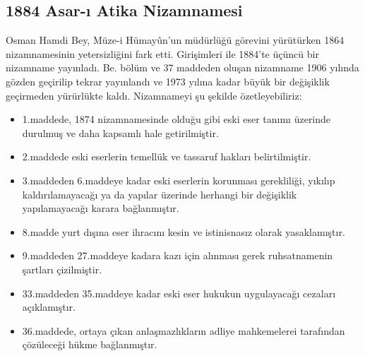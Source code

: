 \subsection{1884 Asar-ı Atika Nizamnamesi}
\indent\indent Osman Hamdi Bey, Müze-i Hümayûn'un müdürlüğü görevini yürütürken 1864 nizamnamesinin yetersizliğini fark etti. Girişimleri ile 1884'te üçüncü bir nizamname yayınladı. Be. bölüm ve 37 maddeden oluşan nizamname 1906 yılında gözden geçirilip tekrar yayınlandı ve 1973 yılına kadar büyük bir değişiklik geçirmeden yürürlükte kaldı.\cite{dilbaz_2} Nizamnameyi şu şekilde özetleyebiliriz:\cite{mumcu_3}
\begin{itemize}
    \item 1.maddede, 1874 nizamnamesinde olduğu gibi eski eser tanımı üzerinde durulmuş ve daha kapsamlı hale getirilmiştir.
    \item 2.maddede eski eserlerin temellük ve tassaruf hakları belirtilmiştir.
    \item 3.maddeden 6.maddeye kadar eski eserlerin korunması gerekliliği, yıkılıp kaldırılamayacağı ya da yapılar üzerinde herhangi bir değişiklik yapılamayacağı karara bağlanmıştır.
    \item 8.madde yurt dışına eser ihracını kesin ve istinisnasız olarak yasaklamıştır.
    \item 9.maddeden 27.maddeye kadara kazı için alınması gerek ruhsatnamenin şartları çizilmiştir.
    \item 33.maddeden 35.maddeye kadar eski eser hukukun uygulayacağı cezaları açıklamıştır.
    \item 36.maddede, ortaya çıkan anlaşmazlıkların adliye mahkemelerei tarafından çözüleceği hükme bağlanmıştır.
\end{itemize}